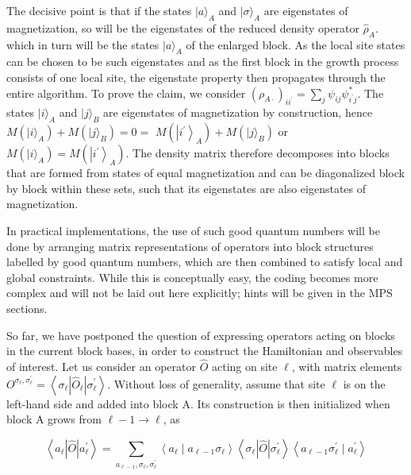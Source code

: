 \documentclass[12pt]{article}
\begin{document}
The decisive point is that if the states $|a\rangle_{A}$ and $|\sigma\rangle_{A}$ are eigenstates of magnetization, so will be the eigenstates of the reduced density operator $\hat{\rho}_{A}$. which in turn will be the states $|a\rangle_{A}$ of the enlarged block. As the local site states can be chosen to be such eigenstates and as the first block in the growth process consists of one local site, the eigenstate property then propagates through the entire algorithm. To prove the claim, we consider $\left(\rho_{A \cdot}\right)_{i i^{\prime}}=\sum_{j} \psi_{i j} \psi_{i^{\prime} j}^{*}$. The states $|i\rangle_{A}$ and $|j\rangle_{B}$ are eigenstates of magnetization by construction, hence $M\left(|i\rangle_{A}\right)+M\left(|j\rangle_{B}\right)=0=$ $M\left(\left|i^{\prime}\right\rangle_{A}\right)+M\left(|j\rangle_{B}\right)$ or $M\left(|i\rangle_{A}\right)=M\left(\left|i^{\prime}\right\rangle_{A}\right)$. The density matrix therefore decomposes into blocks that are formed from states of equal magnetization and can be diagonalized block by block within these sets, such that its eigenstates are also eigenstates of magnetization.

In practical implementations, the use of such good quantum numbers will be done by arranging matrix representations of operators into block structures labelled by good quantum numbers, which are then combined to satisfy local and global constraints. While this is conceptually easy, the coding becomes more complex and will not be laid out here explicitly; hints will be given in the MPS sections.

So far, we have postponed the question of expressing operators acting on blocks in the current block bases, in order to construct the Hamiltonian and observables of interest. Let us consider an operator $\hat{O}$ acting on site $\ell$, with matrix elements $O^{\sigma_{\ell}, \sigma_{\ell}^{\prime}}=\left\langle\sigma_{\ell}\left|\hat{O}_{\ell}\right| \sigma_{\ell}^{\prime}\right\rangle$. Without loss of generality, assume that site $\ell$ is on the left-hand side and added into block A. Its construction is then initialized when block A grows from $\ell-1 \rightarrow \ell$, as


\begin{equation*}
\left\langle a_{\ell}|\hat{O}| a_{\ell}^{\prime}\right\rangle=\sum_{a_{\ell-1}, \sigma_{\ell}, \sigma_{\ell}^{\prime}}\left\langle a_{\ell} \mid a_{\ell-1} \sigma_{\ell}\right\rangle\left\langle\sigma_{\ell}|\hat{O}| \sigma_{\ell}^{\prime}\right\rangle\left\langle a_{\ell-1} \sigma_{\ell}^{\prime} \mid a_{\ell}^{\prime}\right\rangle \tag{5}
\end{equation*}
\end{document}
